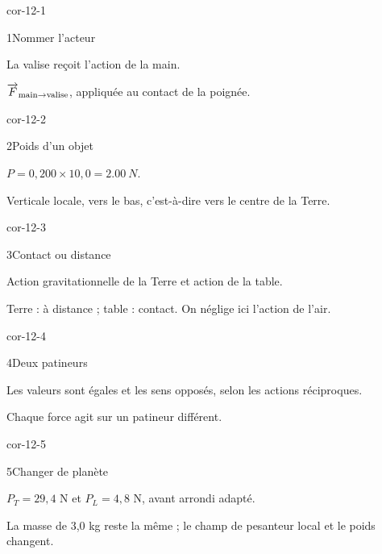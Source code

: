 \clearpage{}
\corrigesSouples
\begin{blocLivre}{cor-12-1}\begin{corrige}{1}{Nommer l’acteur}
\begin{questions}
\item La valise reçoit l’action de la main.
\item $\overrightarrow{F}_{\mathrm{main}\to\mathrm{valise}}$, appliquée au contact de la poignée.
\end{questions}
\end{corrige}\end{blocLivre}
\begin{blocLivre}{cor-12-2}\begin{corrige}{2}{Poids d’un objet}
\begin{questions}
\item $P=0,200\times10,0=\qty{2,00}{N}$.
\item Verticale locale, vers le bas, c’est-à-dire vers le centre de la Terre.
\end{questions}
\end{corrige}\end{blocLivre}
\begin{blocLivre}{cor-12-3}\begin{corrige}{3}{Contact ou distance}
\begin{questions}
\item Action gravitationnelle de la Terre et action de la table.
\item Terre : à distance ; table : contact. On néglige ici l’action de l’air.
\end{questions}
\end{corrige}\end{blocLivre}
\begin{blocLivre}{cor-12-4}\begin{corrige}{4}{Deux patineurs}
\begin{questions}
\item Les valeurs sont égales et les sens opposés, selon les actions réciproques.
\item Chaque force agit sur un patineur différent.
\end{questions}
\end{corrige}\end{blocLivre}
\begin{blocLivre}{cor-12-5}\begin{corrige}{5}{Changer de planète}
\begin{questions}
\item $P_T=29,4$ N et $P_L=4,8$ N, avant arrondi adapté.
\item La masse de 3,0 kg reste la même ; le champ de pesanteur local et le poids changent.
\end{questions}
\end{corrige}\end{blocLivre}
